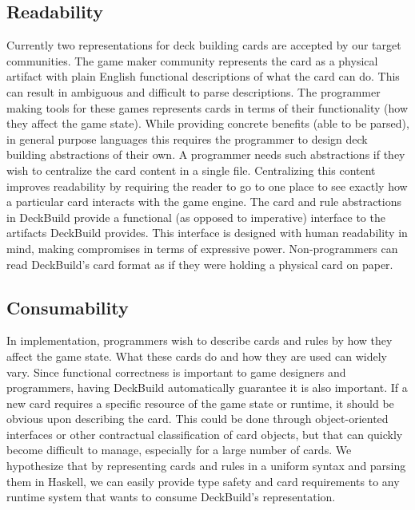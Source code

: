 \subsection{Readability}
Currently two representations for deck building cards are accepted by our target communities. The game maker
community represents the card as a physical artifact with plain English functional descriptions
of what the card can do. This can result in ambiguous and difficult to parse descriptions. The
programmer making tools for these games represents cards in terms of their functionality (how they affect
the game state). While providing concrete benefits (able to be parsed), in general purpose languages this
requires the programmer to design deck building abstractions of their own. A programmer needs such abstractions
if they wish to centralize the card content in a single file. Centralizing this content improves readability
by requiring the reader to go to one place to see exactly how a particular card interacts with the game engine.
The card and rule abstractions in DeckBuild provide a functional (as opposed to imperative) interface to
the artifacts DeckBuild provides. This interface is designed with human readability in mind, making
compromises in terms of expressive power. Non-programmers can read DeckBuild's card format as if they were
holding a physical card on paper.

\subsection{Consumability}
In implementation, programmers wish to describe cards and rules by how they affect the game
state. What these cards do and how they are used can widely vary. Since functional correctness
is important to game designers and programmers, having DeckBuild automatically guarantee
it is also important. If a new card requires a specific resource of the game
state or runtime, it should be obvious upon describing the card.
This could be done through object-oriented interfaces or other contractual classification
of card objects, but that can quickly become difficult to manage, especially for a large number of cards. We hypothesize that
by representing cards and rules in a uniform syntax and parsing them in Haskell, we can easily provide type safety and
card requirements to any runtime system that wants to consume DeckBuild's representation.
